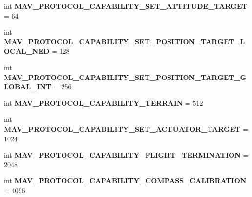 \begin{DoxyCompactItemize}
int {\bfseries M\+A\+V\+\_\+\+P\+R\+O\+T\+O\+C\+O\+L\+\_\+\+C\+A\+P\+A\+B\+I\+L\+I\+T\+Y\+\_\+\+S\+E\+T\+\_\+\+A\+T\+T\+I\+T\+U\+D\+E\+\_\+\+T\+A\+R\+G\+ET} = 64
\item 
\mbox{\label{namespacepymavlink_1_1dialects_1_1v10_a80239bfc308cbcb6f4e84937f9dbbe23}} 
int {\bfseries M\+A\+V\+\_\+\+P\+R\+O\+T\+O\+C\+O\+L\+\_\+\+C\+A\+P\+A\+B\+I\+L\+I\+T\+Y\+\_\+\+S\+E\+T\+\_\+\+P\+O\+S\+I\+T\+I\+O\+N\+\_\+\+T\+A\+R\+G\+E\+T\+\_\+\+L\+O\+C\+A\+L\+\_\+\+N\+ED} = 128
\item 
\mbox{\label{namespacepymavlink_1_1dialects_1_1v10_aad1185905cc9646ecb9fec1cb363d9d1}} 
int {\bfseries M\+A\+V\+\_\+\+P\+R\+O\+T\+O\+C\+O\+L\+\_\+\+C\+A\+P\+A\+B\+I\+L\+I\+T\+Y\+\_\+\+S\+E\+T\+\_\+\+P\+O\+S\+I\+T\+I\+O\+N\+\_\+\+T\+A\+R\+G\+E\+T\+\_\+\+G\+L\+O\+B\+A\+L\+\_\+\+I\+NT} = 256
\item 
\mbox{\label{namespacepymavlink_1_1dialects_1_1v10_a400f8e382c534b050f916d4cc14b48f6}} 
int {\bfseries M\+A\+V\+\_\+\+P\+R\+O\+T\+O\+C\+O\+L\+\_\+\+C\+A\+P\+A\+B\+I\+L\+I\+T\+Y\+\_\+\+T\+E\+R\+R\+A\+IN} = 512
\item 
\mbox{\label{namespacepymavlink_1_1dialects_1_1v10_a7a9b16ef08743b77b9c55ebeabb1c74c}} 
int {\bfseries M\+A\+V\+\_\+\+P\+R\+O\+T\+O\+C\+O\+L\+\_\+\+C\+A\+P\+A\+B\+I\+L\+I\+T\+Y\+\_\+\+S\+E\+T\+\_\+\+A\+C\+T\+U\+A\+T\+O\+R\+\_\+\+T\+A\+R\+G\+ET} = 1024
\item 
\mbox{\label{namespacepymavlink_1_1dialects_1_1v10_a361af06a95b33c87aeb61f3974bbb644}} 
int {\bfseries M\+A\+V\+\_\+\+P\+R\+O\+T\+O\+C\+O\+L\+\_\+\+C\+A\+P\+A\+B\+I\+L\+I\+T\+Y\+\_\+\+F\+L\+I\+G\+H\+T\+\_\+\+T\+E\+R\+M\+I\+N\+A\+T\+I\+ON} = 2048
\item 
\mbox{\label{namespacepymavlink_1_1dialects_1_1v10_a37afe358862a08a6254e0c11315b9a18}} 
int {\bfseries M\+A\+V\+\_\+\+P\+R\+O\+T\+O\+C\+O\+L\+\_\+\+C\+A\+P\+A\+B\+I\+L\+I\+T\+Y\+\_\+\+C\+O\+M\+P\+A\+S\+S\+\_\+\+C\+A\+L\+I\+B\+R\+A\+T\+I\+ON} = 4096
\item 
\mbox{\label{namespacepymavlink_1_1dialects_1_1v10_a1037e50dc4e819e79520e71c4cf133ae}} 

\end{DoxyCompactItemize}
